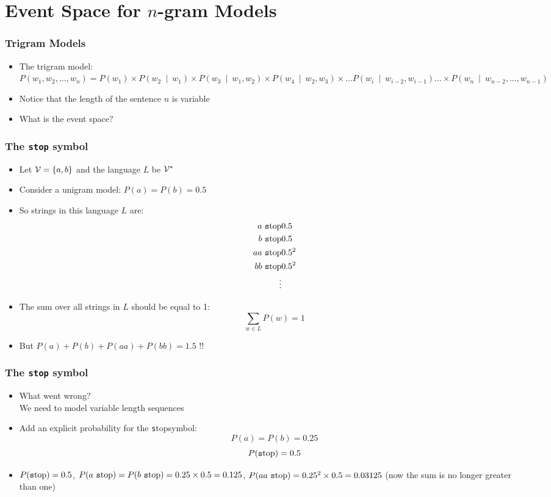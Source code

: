 \section{Event Space for $n$-gram Models}

\begin{frame}
\frametitle{Trigram Models}
\begin{itemize}[<+->]
\item The trigram model:\\
$P(w_1, w_2, \ldots, w_n) = P(w_1) \times P(w_2~\mid~w_1) \times 
P(w_3~\mid~w_1, w_2) \times P(w_4~\mid~w_2, w_3) 
\times \ldots P(w_i~\mid~w_{i-2}, w_{i-1}) \ldots 
\times P(w_n~\mid~w_{n-2}, \ldots, w_{n-1}) $
\item Notice that the length of the sentence $n$ is variable
\item What is the event space?
\end{itemize}
\end{frame}

\newcommand{\lmstop}{\mbox{\texttt stop}}

\begin{frame}
\frametitle{The {\tt stop} symbol}
\begin{itemize}[<+->]
\item Let ${\cal V} = \{ a, b \}$ and the language $L$ be ${\cal V}^\ast$
\item Consider a unigram model: $P(a) = P(b) = 0.5$
\item So strings in this language $L$ are:
\begin{eqnarray*}
a\ \lmstop & 0.5 \\
b\ \lmstop & 0.5 \\
aa\ \lmstop & 0.5^2 \\
bb\ \lmstop & 0.5^2 \\
\vdots
\end{eqnarray*}
\item The sum over all strings in $L$ should be equal to 1:
\[ \sum_{w \in L} P(w) = 1 \]
\item But $P(a) + P(b) + P(aa) + P(bb) = 1.5$ !! 
\end{itemize}
\end{frame}

\begin{frame}
\frametitle{The {\tt stop} symbol}
\begin{itemize}[<+->]
\item What went wrong? \\
We need to model variable length sequences
\item Add an explicit probability for the \lmstop symbol: 
\[ P(a) = P(b) = 0.25  \]
\[ P(\lmstop) = 0.5 \]
\item $P(\lmstop) = 0.5$, $P(a\ \lmstop) = P(b\ \lmstop) = 0.25 \times 0.5 = 0.125$, 
$P(aa\ \lmstop) = 0.25^2 \times 0.5 = 0.03125$ (now the sum is no longer greater than one)
\end{itemize}
\end{frame}


